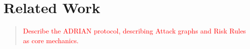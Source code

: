 \section{Related Work}
\label{sec:related-work}

\begin{quote}\textcolor{red}{
    Describe the ADRIAN protocol, describing Attack graphs and Risk Rules as core mechanics. 
}\end{quote}
